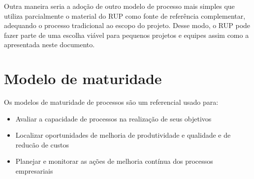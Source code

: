 Outra maneira seria a adoção de outro modelo de processo mais simples que utiliza parcialmente o material do RUP como fonte de referência complementar, adequando o processo tradicional ao escopo do projeto. Desse modo, o RUP pode fazer parte de uma escolha viável para pequenos projetos e equipes assim como a apresentada neste documento.

  \section{Modelo de maturidade}
  Os modelos de maturidade de processos são um referencial usado para:
\begin{itemize}
\item Avaliar a capacidade de processos na realização de seus objetivos
\item Localizar oportunidades de melhoria de produtividade e qualidade e de reducão de custos
\item Planejar e monitorar as ações de melhoria contínua dos processos empresariais
\end{itemize}

